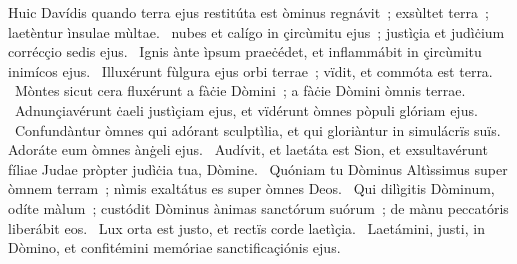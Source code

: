 { Huic Davídis quando terra ejus restitúta est}
{%
òminus regnávit~; exsùltet terra~; laetèntur ìnsulae mùltae. 
~nubes et calígo in çircùmitu ejus~; justìçia et judìċium corrécçio sedis ejus. 
~Ignis ànte ìpsum praeċédet, et inflammábit in çircùmitu inimícos ejus. 
~Illuxérunt fùlgura ejus orbi terrae~; vïdit, et commóta est terra. 
~Mòntes sicut cera fluxérunt a fàċie Dòmini~; a fàċie Dòmini òmnis terrae. 
~Adnunçiavérunt ċaeli justìçiam ejus, et vïdérunt òmnes pòpuli glóriam ejus. 
~Confundàntur òmnes qui adórant sculptìlia, et qui gloriàntur in simulácrïs suïs. Adoráte eum òmnes ànġeli ejus. 
~Audívit, et laetáta est Sion, et exsultavérunt fíliae Judae pròpter judìċia tua, Dòmine. 
~Quóniam tu Dòminus Altìssimus super òmnem terram~; nìmis exaltátus es super òmnes Deos. 
~Qui dilìgitis Dòminum, odíte màlum~; custódit Dòminus ànimas sanctórum suórum~; de mànu peccatóris liberábit eos. 
~Lux orta est justo, et rectïs corde laetìçia. 
~Laetámini, justi, in Dòmino, et confitémini memóriae sanctificaçiónis ejus. 
}

